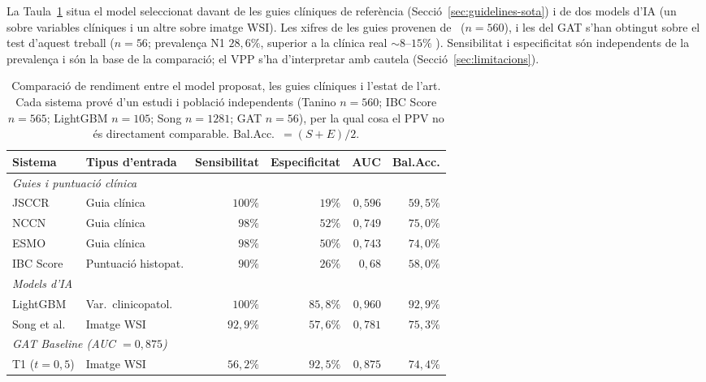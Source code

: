 \documentclass[10pt,a4paper,twocolumn,twoside]{article}
\begin{document}
La Taula~\ref{tab:comparison} situa el model seleccionat davant de les guies
clíniques de referència (Secció~\ref{sec:guidelines-sota}) i de dos models d'IA (un sobre
variables clíniques i un altre sobre imatge WSI).
Les xifres de les guies provenen de~\cite{tanino2024comparative} ($n\!=\!560$),
i les del GAT s'han obtingut sobre el test d'aquest treball ($n\!=\!56$;
prevalença N1 $28{,}6\%$, superior a la clínica real $\sim\!8$–$15\%$
\cite{zaffalon2023}). Sensibilitat i especificitat són independents de la
prevalença i són la base de la comparació; el VPP s'ha d'interpretar amb
cautela (Secció~\ref{sec:limitacions}).

\begin{table}[h]
\centering
\caption{Comparació de rendiment entre el model proposat, les guies clíniques i l'estat de l'art.
Cada sistema prové d'un estudi i població independents
(Tanino $n\!=\!560$; IBC Score $n\!=\!565$; LightGBM $n\!=\!105$; Song $n\!=\!1281$; GAT $n\!=\!56$),
per la qual cosa el PPV no és directament comparable. Bal.Acc.~$=(S\!+\!E)/2$.}
\label{tab:comparison}
\small
\begin{tabular}{llrrrr}
\toprule
\textbf{Sistema} & \textbf{Tipus d'entrada} & \textbf{Sensibilitat} & \textbf{Especificitat} & \textbf{AUC} & \textbf{Bal.Acc.} \\
\midrule
\multicolumn{6}{l}{\textit{Guies i puntuació clínica}} \\[2pt]
JSCCR \cite{jsccr2019}        & Guia clínica  & $100\%$ & $19\%$  & $0{,}596$ & $59{,}5\%$ \\
NCCN                           & Guia clínica  & $98\%$  & $52\%$  & $0{,}749$ & $75{,}0\%$ \\
ESMO \cite{tanino2024comparative} & Guia clínica  & $98\%$  & $50\%$  & $0{,}743$ & $74{,}0\%$ \\
IBC Score \cite{dawson2024budding} & Puntuació histopat. & $90\%$ & $26\%$ & $0{,}68$ & $58{,}0\%$ \\
\midrule
\multicolumn{6}{l}{\textit{Models d'IA}} \\[2pt]
LightGBM \cite{piao2023ai}                          & Var.\ clinicopatol. & $100\%$  & $85{,}8\%$ & $0{,}960$ & $92{,}9\%$ \\
Song et al.\ \cite{song2024lnm}                     & Imatge WSI & $92{,}9\%$ & $57{,}6\%$ & $0{,}781$ & $75{,}3\%$ \\
\multicolumn{6}{l}{\textit{GAT Baseline (AUC $= 0{,}875$)}} \\[1pt]
\quad T1 ($t\!=\!0{,}5$)                                        & Imatge WSI & $56{,}2\%$ & $92{,}5\%$ & $0{,}875$ & $74{,}4\%$ \\

\end{tabular}
\end{table}
\end{document}
